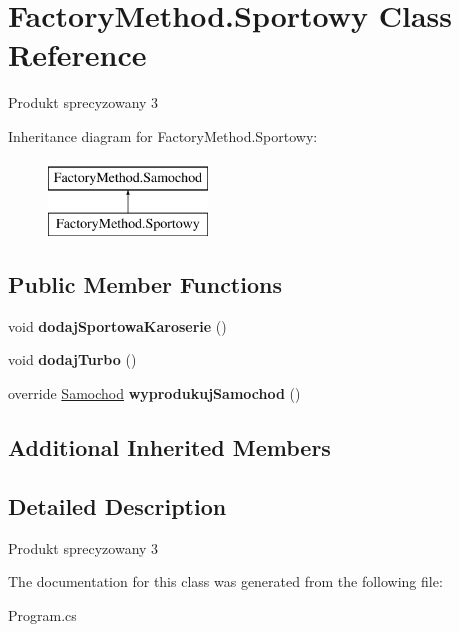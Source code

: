 \hypertarget{class_factory_method_1_1_sportowy}{}\section{Factory\+Method.\+Sportowy Class Reference}
\label{class_factory_method_1_1_sportowy}


Produkt sprecyzowany 3  


Inheritance diagram for Factory\+Method.\+Sportowy\+:\begin{figure}[H]
\begin{center}
\leavevmode
\includegraphics[height=2.000000cm]{class_factory_method_1_1_sportowy}
\end{center}
\end{figure}
\subsection*{Public Member Functions}
\begin{DoxyCompactItemize}
\item 
\mbox{\label{class_factory_method_1_1_sportowy_aa96d8e877667cdd97e7d7803d568a581}} 
void {\bfseries dodaj\+Sportowa\+Karoserie} ()
\item 
\mbox{\label{class_factory_method_1_1_sportowy_a03980efb1c2a0975d22391b8e862717e}} 
void {\bfseries dodaj\+Turbo} ()
\item 
\mbox{\label{class_factory_method_1_1_sportowy_afcee64a80c2622e4fc06360d8b4bd1d8}} 
override \hyperlink{class_factory_method_1_1_samochod}{Samochod} {\bfseries wyprodukuj\+Samochod} ()
\end{DoxyCompactItemize}
\subsection*{Additional Inherited Members}


\subsection{Detailed Description}
Produkt sprecyzowany 3 



The documentation for this class was generated from the following file\+:\begin{DoxyCompactItemize}
\item 
Program.\+cs\end{DoxyCompactItemize}
